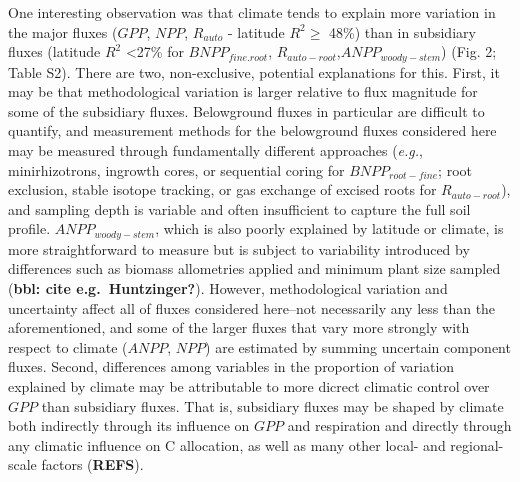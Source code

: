 \documentclass[]{article}
\begin{document}
One interesting observation was that climate tends to explain more
variation in the major fluxes (\(GPP\), \(NPP\), \(R_{auto}\) - latitude
\(R^2\ge\) 48\%) than in subsidiary fluxes (latitude \(R^2\)
\textless{}27\% for \(BNPP_{fine.root}\),
\(R_{auto-root}\),\(ANPP_{woody-stem}\)) (Fig. 2; Table S2). There are
two, non-exclusive, potential explanations for this. First, it may be
that methodological variation is larger relative to flux magnitude for
some of the subsidiary fluxes. Belowground fluxes in particular are
difficult to quantify, and measurement methods for the belowground
fluxes considered here may be measured through fundamentally different
approaches (\emph{e.g.}, minirhizotrons, ingrowth cores, or sequential
coring for \(BNPP_{root-fine}\); root exclusion, stable isotope
tracking, or gas exchange of excised roots for \(R_{auto-root}\)), and
sampling depth is variable and often insufficient to capture the full
soil profile. \(ANPP_{woody-stem}\), which is also poorly explained by
latitude or climate, is more straightforward to measure but is subject
to variability introduced by differences such as biomass allometries
applied and minimum plant size sampled (\textbf{bbl: cite
e.g.~Huntzinger?}). However, methodological variation and uncertainty
affect all of fluxes considered here--not necessarily any less than the
aforementioned, and some of the larger fluxes that vary more strongly
with respect to climate (\(ANPP\), \(NPP\)) are estimated by summing
uncertain component fluxes. Second, differences among variables in the
proportion of variation explained by climate may be attributable to more
dicrect climatic control over \(GPP\) than subsidiary fluxes. That is,
subsidiary fluxes may be shaped by climate both indirectly through its
influence on \(GPP\) and respiration and directly through any climatic
influence on C allocation, as well as many other local- and
regional-scale factors (\textbf{REFS}).
\end{document}
